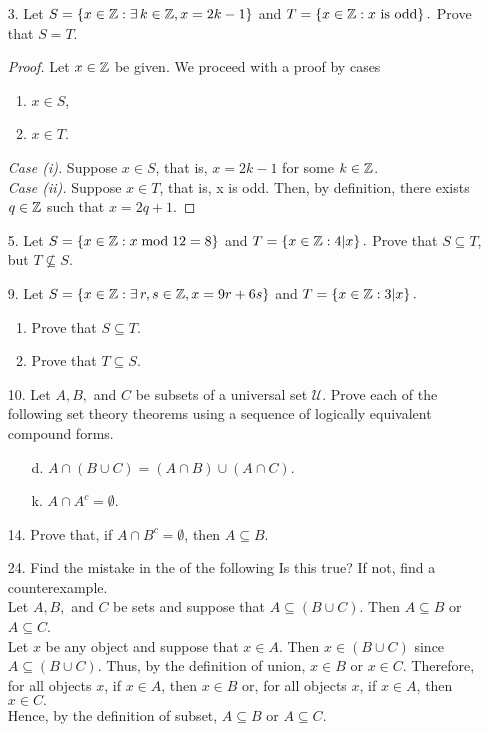 \documentclass[a4paper, 12pt]{../../config/homework}
\begin{document}
\begin{enumerate}
\pagebreak
\item[3.] Let $S = \left\{x\in\mathbb{Z}:\exists\,k\in\mathbb{Z}, x=2k-1\right\}$ and $T=\left\{x\in\mathbb{Z}:x\ \text{is odd}\right\}.$ Prove that $S=T$.
\begin{proof}
Let $x\in\mathbb{Z}$ be given. We proceed with a proof by cases
\begin{enumerate}[label=(\roman*).]
\item $x\in S$,
\item $x\in T$.
\end{enumerate}
\textit{Case (i).} Suppose $x\in S$, that is, $x=2k-1$ for some $k\in\mathbb{Z}$.
\\\textit{Case (ii).} Suppose $x\in T$, that is, x is odd. Then, by definition, there exists $q\in\mathbb{Z}$ such that $x=2q + 1$.
\end{proof}

\pagebreak
\item[5.] Let $S=\left\{x\in\mathbb{Z}:x\;\text{mod}\;12=8\right\}$ and $T=\left\{x\in\mathbb{Z}:4|x\right\}.$ Prove that $S\subseteq T$, but $T\nsubseteq S.$

\pagebreak
\item[9.] Let $S=\left\{x\in\mathbb{Z}:\exists\,r,s\in\mathbb{Z},x=9r+6s\right\}$ and $T=\left\{x\in\mathbb{Z}:3|x\right\}.$
\begin{enumerate}[label=\alph*)]
\item Prove that $S\subseteq T$.
\item Prove that $T \subseteq S$.
\end{enumerate}

\pagebreak
\item[10.] Let $A,B,$ and $C$ be subsets of a universal set $\mathcal{U}$. Prove each of the following set theory theorems using a sequence of logically equivalent compound forms.
\begin{enumerate}
\item[d.] $A \cap \left(B \cup C\right) = \left(A \cap B\right)\cup\left(A\cap C\right).$
\item[k.] $A\cap A^c=\emptyset.$
\end{enumerate}

\pagebreak
\item[14.] Prove that, if $A\cap B^c=\emptyset$, then $A\subseteq B$.

\pagebreak
\item[24.] Find the mistake in the  of the following  Is this  true? If not, find a counterexample.
\\ Let $A,B,$ and $C$ be sets and suppose that $A\subseteq (B \cup C)$. Then $A\subseteq B$ or $A\subseteq C$.
\\ Let $x$ be any object and suppose that $x\in A$. Then $x\in (B\cup C)$ since $A\subseteq (B \cup C).$ Thus, by the definition of union, $x\in B$ or $x\in C$. Therefore, for all objects $x$, if $x\in A$, then $x\in B$ or, for all objects $x$, if $x\in A$, then $x\in C.$
\\Hence, by the definition of subset, $A\subseteq B$ or $A\subseteq C$.
\end{enumerate}
\end{document}
